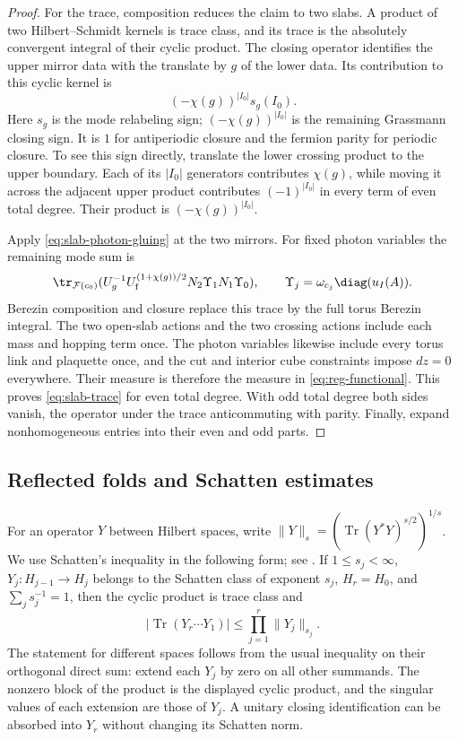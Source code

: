 \begin{proof}
For the trace, composition reduces the claim to two slabs. A product
of two Hilbert--Schmidt kernels is trace class, and its trace is the
absolutely convergent integral of their cyclic product. The closing
operator identifies the upper mirror data with the translate by $g$
of the lower data. Its contribution to this cyclic kernel is
\[
 (-\chi(g))^{|I_0|}s_g(I_0).
\]
Here $s_g$ is the mode relabeling sign; $(-\chi(g))^{|I_0|}$ is the
remaining Grassmann closing sign. It is $1$ for antiperiodic closure
and the fermion parity for periodic closure. To see this sign directly,
translate the lower crossing product to the upper boundary. Each of
its $|I_0|$ generators contributes $\chi(g)$, while moving it across
the adjacent upper product contributes $(-1)^{|I_0|}$ in every term
of even total degree. Their product is $(-\chi(g))^{|I_0|}$.

Apply \eqref{eq:slab-photon-gluing} at the two mirrors. For fixed
photon variables the remaining mode sum is
\[
 \tr_{\mathcal F(c_0)}
    (U_g^{-1}U_{\mathrm f}^{(1+\chi(g))/2}
                       N_2\Upsilon_1N_1\Upsilon_0),
 \qquad \Upsilon_j=\omega_{c_j}\diag(u_I(A)).
\]
Berezin composition and closure replace this trace by the full torus
Berezin integral. The two open-slab actions and the two crossing
actions include each mass and hopping term once. The photon variables
likewise include every torus link and plaquette once, and the cut and
interior cube constraints impose $dz=0$ everywhere. Their measure is
therefore the measure in \eqref{eq:reg-functional}. This proves
\eqref{eq:slab-trace} for even total degree. With odd total degree both
sides vanish, the operator under the trace anticommuting with parity.
Finally, expand nonhomogeneous entries into their even and odd parts.
\end{proof}

\subsection{Reflected folds and Schatten estimates}\label{subsec:slab-folds}

For an operator $Y$ between Hilbert spaces, write
$\|Y\|_s=(\operatorname{Tr}(Y^*Y)^{s/2})^{1/s}$. We use Schatten's
inequality in the following form; see \cite[slides~55--57]{PongeSchatten2025}. If $1\le s_j<\infty$,
$Y_j:H_{j-1}\to H_j$ belongs to the Schatten class of exponent $s_j$,
$H_r=H_0$, and $\sum_js_j^{-1}=1$, then the cyclic product is trace
class and
\begin{equation}\label{eq:slab-schatten-holder}
 |\operatorname{Tr}(Y_r\cdots Y_1)|
                \le\prod_{j=1}^r\|Y_j\|_{s_j}.
\end{equation}
The statement for different spaces follows from the usual inequality
on their orthogonal direct sum: extend each $Y_j$ by zero on all other
summands. The nonzero block of the product is the displayed cyclic
product, and the singular values of each extension are those of $Y_j$.
A unitary closing identification can be absorbed into $Y_r$ without
changing its Schatten norm.

